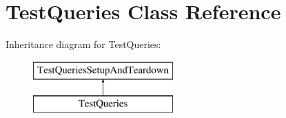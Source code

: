 \section{Test\+Queries Class Reference}
\label{classtests_1_1functest__modbus_1_1_test_queries}
Inheritance diagram for Test\+Queries\+:\begin{figure}[H]
\begin{center}
\leavevmode
\includegraphics[height=2.000000cm]{classtests_1_1functest__modbus_1_1_test_queries}
\end{center}
\end{figure}
